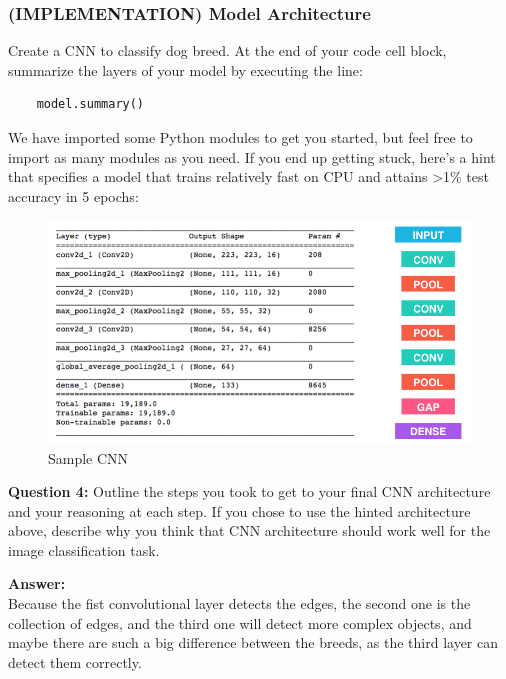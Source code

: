 \documentclass[11pt]{article}
\makeatletter
\def\maxwidth{\ifdim\Gin@nat@width>\linewidth\linewidth
    \else\Gin@nat@width\fi}
\let\Oldincludegraphics\includegraphics
\renewcommand{\includegraphics}[1]{\Oldincludegraphics[width=.8\maxwidth]{#1}}
\makeatother
\begin{document}
    \subsubsection{(IMPLEMENTATION) Model
Architecture}\label{implementation-model-architecture}

Create a CNN to classify dog breed. At the end of your code cell block,
summarize the layers of your model by executing the line:

\begin{verbatim}
    model.summary()
\end{verbatim}

We have imported some Python modules to get you started, but feel free
to import as many modules as you need. If you end up getting stuck,
here's a hint that specifies a model that trains relatively fast on CPU
and attains \textgreater{}1\% test accuracy in 5 epochs:

\begin{figure}
\centering
\includegraphics{images/sample_cnn.png}
\caption{Sample CNN}
\end{figure}

\textbf{Question 4:} Outline the steps you took to get to your final CNN
architecture and your reasoning at each step. If you chose to use the
hinted architecture above, describe why you think that CNN architecture
should work well for the image classification task.

\textbf{Answer:}\\
Because the fist convolutional layer detects the edges, the second one
is the collection of edges, and the third one will detect more complex
objects, and maybe there are such a big difference between the breeds,
as the third layer can detect them correctly.
\end{document}
